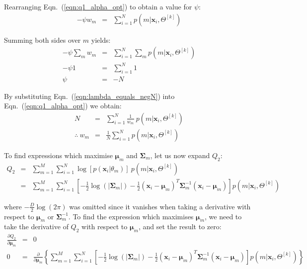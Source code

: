 \documentclass[10pt,a4paper]{article}
\def\Vec#1{{\boldsymbol{#1}}}
\def\Mat#1{{\boldsymbol{#1}}}
\begin{document}
\noindent
Rearranging Eqn.~(\ref{eqn:q1_alpha_opt}) to obtain a value for $\psi$:
%
\begin{eqnarray}
	-\psi w_m & = & \sum\nolimits_{i=1}^{N} p(m|\Vec{x}_i, \Theta^{[k]})
\end{eqnarray}

\noindent
Summing both sides over $m$ yields:
%
\begin{eqnarray}
	-\psi \sum\nolimits_m w_m & = & \sum\nolimits_{i=1}^{N} \sum\nolimits_m p(m|\Vec{x}_i, \Theta^{[k]}) \\
	-\psi 1 & = & \sum\nolimits_{i=1}^{N} 1 \\
	\psi & =  & -N	\label{eqn:lambda_equals_negN}
\end{eqnarray}

\noindent
By substituting Eqn.~(\ref{eqn:lambda_equals_negN}) into Eqn.~(\ref{eqn:q1_alpha_opt}) we obtain:
%
\begin{eqnarray}
			N & = & \sum\nolimits_{i=1}^{N} \frac{1}{w_m} ~ p(m|\Vec{x}_i, \Theta^{[k]}) \\
	\therefore ~ w_m & = & \frac{1}{N} \sum\nolimits_{i=1}^{N} p(m|\Vec{x}_i, \Theta^{[k]}) 
	\label{eqn:alpha_m_solved}
\end{eqnarray}

\noindent
To find expressions which maximise $\Vec{\mu}_m$ and $\Mat{\Sigma}_m$, let us now expand $Q_2$:
%
\begin{eqnarray}
	Q_2 & = &   \sum\nolimits_{m=1}^{M}	\sum\nolimits_{i=1}^{N} \log[  p(\Vec{x}_i | \theta_m) ] ~ p(m|\Vec{x}_i, \Theta^{[k]}) 	\\
	 ~  & = &   \sum\nolimits_{m=1}^{M} \sum\nolimits_{i=1}^{N} \left[
					- \frac{1}{2} \log(|\Mat{\Sigma}_m|) - \frac{1}{2} (\Vec{x}_i - \Vec{\mu}_m)^T \Mat{\Sigma}_m^{-1} (\Vec{x}_i - \Vec{\mu}_m)
					\right] p(m|\Vec{x}_i, \Theta^{[k]})  \label{eqn:q2_expanded}
\end{eqnarray}

\noindent
where $-\frac{D}{2} \log(2\pi)$ was omitted since it vanishes when taking a derivative with respect to $\Vec{\mu}_m$ or $\Mat{\Sigma}^{-1}_m$.
To find the expression which maximises $\Vec{\mu}_m$, we need to take the derivative of $Q_2$ with respect to $\Vec{\mu}_m$, and set the result to zero:
%
\begin{eqnarray}
	\frac{\partial Q_2}{\partial \Vec{\mu}_m} & = & 0   \\
 0 & = & \frac{\partial}{\partial \Vec{\mu}_m} \left\{ \sum\nolimits_{m=1}^{M} \sum\nolimits_{i=1}^{N} \left[
					- \frac{1}{2} \log(|\Mat{\Sigma}_m|) - \frac{1}{2} (\Vec{x}_i - \Vec{\mu}_m)^T \Mat{\Sigma}_m^{-1} (\Vec{x}_i - \Vec{\mu}_m)
					\right] p(m|\Vec{x}_i, \Theta^{[k]}) \right\} ~~~ ~~~ ~~~  \label{eqn:q2_mu_partone}
\end{eqnarray}%
\end{document}
